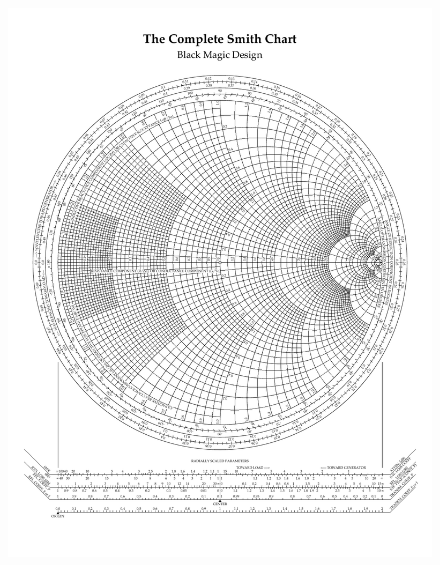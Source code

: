 \documentclass[12pt,a4paper]{article}
\begin{document}
\begin{figure}[H]
\centering
\vspace{4cm}
\hspace*{-1.6cm}
\includegraphics[scale=1.0,trim=1cm 2cm 1cm 3cm, clip]{./SmithChart}
\label{fig:SmithChart2}
\end{figure}
\newpage
\end{document}

